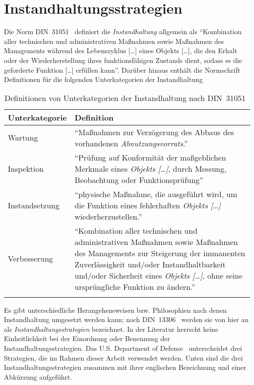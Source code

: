 \chapter{Instandhaltungsstrategien}
\label{ch:instandhaltungsstrategien}
Die Norm DIN~31051~\cite{DIN.2019} definiert die \textit{Instandhaltung} allgemein als \enquote{Kombination aller technischen und administrativen Maßnahmen sowie Maßnahmen des Managements während des Lebenszyklus [\dots] eines Objekts [\dots], die den Erhalt oder der Wiederherstellung ihres funktionsfähigen Zustands dient, sodass es die geforderte Funktion [\dots] erfüllen kann}. Darüber hinaus enthält die Normschrift Definitionen für die folgenden Unterkategorien der Instandhaltung

\begin{table}[ht]
	\centering
    \begin{tabularx}{\textwidth}{lX}
        \toprule
        Unterkategorie & Definition\\
        \midrule
        Wartung & \enquote{Maßnahmen zur Verzögerung des Abbaus des vorhandenen \textit{Abnutzungsvorrats}.}\\
        \midrule
        Inspektion & \enquote{Prüfung auf Konformität der maßgeblichen Merkmale eines \textit{Objekts […]}, durch Messung, Beobachtung oder Funktionsprüfung}\\
        \midrule
        Instandsetzung & \enquote{physische Maßnahme, die ausgeführt wird, um die Funktion eines fehlerhaften \textit{Objekts […] }wiederherzustellen.}\\
        \midrule
        Verbesserung & \enquote{Kombination aller technischen und administrativen Maßnahmen sowie Maßnahmen des Managements zur Steigerung der immanenten Zuverlässigkeit und/oder Instandhaltbarkeit und/oder Sicherheit eines \textit{Objekts […]}, ohne seine ursprüngliche Funktion zu ändern.}\\
        \bottomrule
        \caption{Definitionen von Unterkategorien der Instandhaltung nach DIN~{31051}~\cite{DIN.2019}}%
        \label{tab:definition_unterkategorien_instandhaltung}	%
    \end{tabularx}
\end{table}

Es gibt unterschiedliche Herangehensweisen bzw. Philosophien nach denen Instandhaltung umgesetzt werden kann; nach DIN~13306~\cite{DIN.2018} werden sie von hier an als \textit{Instandhaltungsstrategien} bezeichnet. In der Literatur herrscht keine Einheitlichkeit bei der Einordnung oder Benennung der Instandhaltungsstrategien. Das U.S. Department of Defense~\cite[S.~16]{U.S.DepartmentofDefense.2008} unterscheidet drei Strategien, die im Rahmen dieser Arbeit verwendet werden. Unten sind die drei Instandhaltungsstrategien zusammen mit ihrer englischen Bezeichnung und einer Abkürzung aufgeführt.

